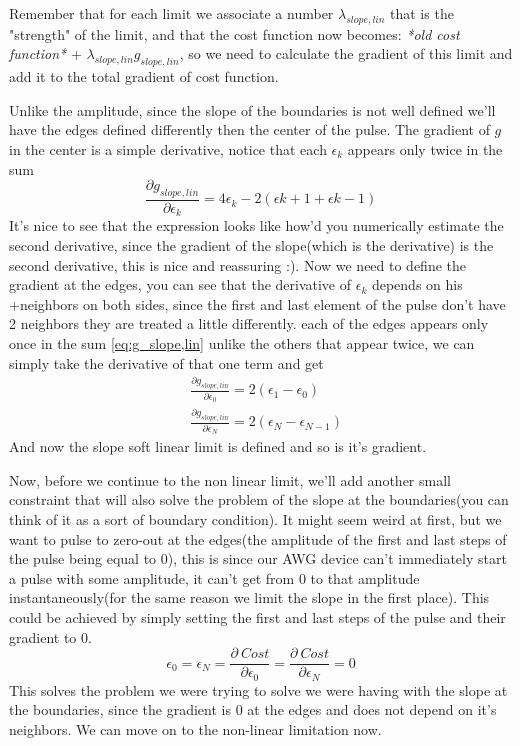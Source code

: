\documentclass[english, a4paper, 12pt, twoside]{article}
\numberwithin{equation}{section} %
\begin{document}
Remember that for each limit we associate a number \(\lambda_{slope, lin}\) that is the "strength" of the limit, and that the cost function now becomes: \textit{*old cost function*} + \(\lambda_{slope, lin} g_{slope, lin}\), so we need to calculate the gradient of this limit and add it to the total gradient of cost function.

Unlike the amplitude, since the slope of the boundaries is not well defined we'll have the edges defined differently then the center of the pulse. The gradient of \(g\) in the center is a simple derivative, notice that each \(\epsilon_k\) appears only twice in the sum
\[
    \frac{\partial g_{slope, lin}}{\partial \epsilon_k} = 4\epsilon_k - 2(\epsilon{k+1} + \epsilon{k-1})
\]
It's nice to see that the expression looks like how'd you numerically estimate the second derivative, since the gradient of the slope(which is the derivative) is the second derivative, this is nice and reassuring :). Now we need to define the gradient at the edges, you can see that the derivative of \(\epsilon_k\) depends on his 
+neighbors on both sides, since the first and last element of the pulse don't have 2 neighbors they are treated a little differently. each of the edges appears only once in the sum \ref{eq:g_slope,lin} unlike the others that appear twice, we can simply take the derivative of that one term and get
\begin{align*}
    &\frac{\partial g_{slope, lin}}{\partial \epsilon_0} = 2(\epsilon_1 - \epsilon_0) \\
    &\frac{\partial g_{slope, lin}}{\partial \epsilon_N} = 2(\epsilon_N - \epsilon_{N-1})
\end{align*} %
And now the slope soft linear limit is defined and so is it's gradient.

Now, before we continue to the non linear limit, we'll add another small constraint that will also solve the problem of the slope at the boundaries(you can think of it as a sort of boundary condition). It might seem weird at first, but we want to pulse to zero-out at the edges(the amplitude of the first and last steps of the pulse being equal to 0), this is since our AWG device can't immediately start a pulse with some amplitude, it can't get from 0 to that amplitude instantaneously(for the same reason we limit the slope in the first place). This could be achieved by simply setting the first and last steps of the pulse and their gradient to 0.
\[
    \epsilon_0 = \epsilon_N = \frac{\partial \ Cost}{\partial \epsilon_0} = \frac{\partial \ Cost}{\partial \epsilon_N} = 0
\]
This solves the problem we were trying to solve we were having with the slope at the boundaries, since the gradient is 0 at the edges and does not depend on it's neighbors. We can move on to the non-linear limitation now.
\end{document}
